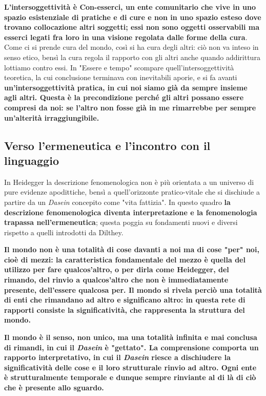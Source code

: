 \textbf{L'intersoggettività è Con-esserci, un ente comunitario che vive in uno spazio esistenziale di pratiche e di cure e non in uno spazio esteso dove trovano collocazione altri soggetti; essi non sono oggetti osservabili ma esserci legati fra loro in una visione regolata dalle forme della cura}. Come ci si prende cura del mondo, così si ha cura degli altri: ciò non va inteso in senso etico, bensì la cura regola il rapporto con gli altri anche quando addirittura lottiamo contro essi.
In "Essere e tempo" scompare quell'intersoggettività teoretica, la cui conclusione terminava con inevitabili aporie, e si fa avanti \textbf{un'intersoggettività pratica, in cui noi siamo già da sempre insieme agli altri. Questa è la precondizione perché gli altri possano essere compresi da noi: se l'altro non fosse già in me rimarrebbe per sempre un'alterità irraggiungibile.}

\subsection{Verso l'ermeneutica e l'incontro con il linguaggio}

In Heidegger la descrizione fenomenologica non è
più orientata a un universo di pure evidenze
apodittiche, bensì a quell'orizzonte
pratico-vitale che si dischiude a partire da un
\textit{Dasein} concepito come "vita fattizia". In questo
quadro \textbf{la descrizione fenomenologica diventa
interpretazione e la fenomenologia trapassa
nell'ermeneutica}; questa poggia su fondamenti nuovi
e diversi rispetto a quelli introdotti da Dilthey.

\textbf{Il mondo non è una totalità di cose davanti a noi
ma di cose "per" noi, cioè di mezzi: la caratteristica
fondamentale del mezzo è quella del utilizzo per
fare qualcos'altro, o per dirla come Heidegger, del
rimando, del rinvio a qualcos'altro che non è
immediatamente presente, dell'essere qualcosa per.
Il mondo si rivela perciò una totalità di enti che
rimandano ad altro e significano altro: in questa
rete di rapporti consiste la significatività, che rappresenta la
struttura del mondo.}

\textbf{Il mondo è il senso, non unico, ma una totalità
infinita e mai conclusa di rimandi, in cui il \textit{Dasein}
è "gettato".
La comprensione comporta un rapporto interpretativo,
in cui il \textit{Dasein} riesce a dischiudere la
significatività delle cose e il loro strutturale
rinvio ad altro. Ogni ente è strutturalmente
temporale e dunque sempre rinviante al di là di
ciò che è presente allo sguardo.}


